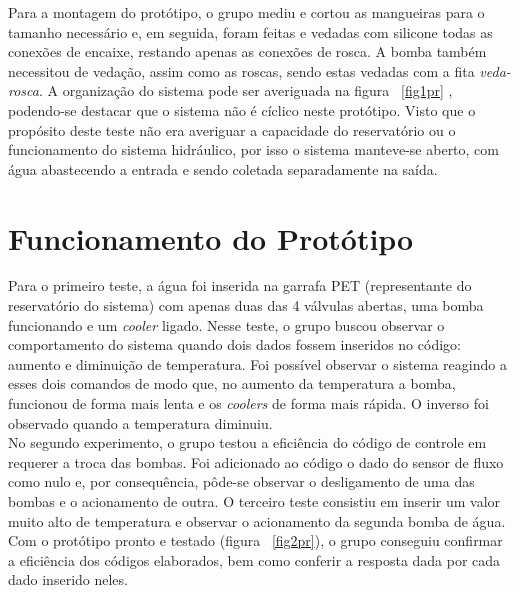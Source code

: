 Para a montagem do protótipo, o grupo mediu e cortou as mangueiras para o tamanho necessário e, em seguida, foram feitas e vedadas com silicone todas as conexões de encaixe, restando apenas as conexões de rosca. A bomba também necessitou de vedação, assim como as roscas, sendo estas vedadas com a fita \emph{veda-rosca}. A organização do sistema pode ser averiguada na figura ~\ref{fig1pr} , podendo-se destacar que o sistema não é cíclico neste protótipo. Visto que o propósito deste teste não era averiguar a capacidade do reservatório ou o funcionamento do sistema hidráulico, por isso o sistema manteve-se aberto, com água abastecendo a entrada e sendo coletada separadamente na saída.
\section{Funcionamento do Protótipo}
Para o primeiro teste, a água foi inserida na garrafa PET (representante do reservatório do sistema) com apenas duas das 4 válvulas abertas, uma bomba funcionando e um \textit{cooler} ligado. Nesse teste, o grupo buscou observar o comportamento do sistema quando dois dados fossem inseridos no código: aumento e diminuição de temperatura. Foi possível observar o sistema reagindo a esses dois comandos de modo que, no aumento da temperatura a bomba, funcionou de forma mais lenta e os \textit{coolers} de forma mais rápida. O inverso foi observado quando a temperatura diminuiu.\\
No segundo experimento, o grupo testou a eficiência do código de controle em requerer a troca das bombas. Foi adicionado ao código o dado do sensor de fluxo como nulo e, por consequência, pôde-se observar o desligamento de uma das bombas e o acionamento de outra.  
O terceiro teste consistiu em inserir um valor muito alto de temperatura e observar o acionamento da segunda bomba de água.\\
Com o protótipo pronto e testado (figura ~\ref{fig2pr}), o grupo conseguiu confirmar a eficiência dos códigos elaborados, bem como conferir a resposta dada por cada dado inserido neles.

